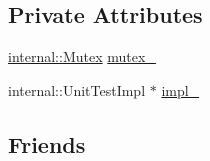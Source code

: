 \subsection*{Private Attributes}
\begin{DoxyCompactItemize}
\item 
\mbox{\hyperlink{classtesting_1_1internal_1_1_mutex}{internal\+::\+Mutex}} \mbox{\hyperlink{classtesting_1_1_unit_test_abb94ef45cf0ab43be81ac6d5b1364132}{mutex\+\_\+}}
\item 
internal\+::\+Unit\+Test\+Impl $\ast$ \mbox{\hyperlink{classtesting_1_1_unit_test_ac655c9e0624be00502f96988a7bb2c48}{impl\+\_\+}}
\end{DoxyCompactItemize}
\subsection*{Friends}
